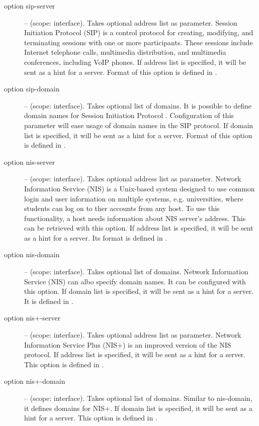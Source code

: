\begin{description}
 \item[option sip-server] -- (scope: interface). Takes optional
   address list as parameter. Session Initiation Protocol
   (SIP) \cite{rfc3263} is a control protocol for creating, modifying,
   and terminating sessions with one or more participants. These
   sessions include Internet telephone calls, multimedia distribution,
   and multimedia conferences, including VoIP phones. If address list
   is specified, it will be sent as a hint for a server. Format of
   this option is defined in \cite{rfc3319}.

 \item[option sip-domain] -- (scope: interface). Takes optional list
   of domains. It is possible to define domain names for Session
   Initiation Protocol \cite{rfc3263}. Configuration of this parameter
   will ease usage of domain names in the SIP protocol. If domain list
   is specified, it will be sent as a hint for a server. Format of
   this option is defined in \cite{rfc3319}.

 \item[option nis-server] -- (scope: interface). Takes optional
   address list as parameter. Network Information Service (NIS) is a
   Unix-based system designed to use common login and user information
   on multiple systems, e.g. universities, where students can log on
   to ther accounts from any host. To use this functionality, a host
   needs information about NIS server's address. This can be retrieved
   with this option. If address list is specified, it will be sent as
   a hint for a server. Its format is defined in \cite{rfc3898}.

 \item[option nis-domain] -- (scope: interface). Takes optional list
   of domains. Network Information Service (NIS) can albo specify
   domain names. It can be configured with this option. If domain list
   is specified, it will be sent as a hint for a server. It is defined
   in \cite{rfc3898}.

 \item[option nis+-server] -- (scope: interface). Takes optional
   address list as parameter. Network Information Service Plus (NIS+)
   is an improved version of the NIS protocol. If address list is
   specified, it will be sent as a hint for a server. This option is
   defined in \cite{rfc3898}.

 \item[option nis+-domain] -- (scope: interface). Takes optional list
   of domains. Similar to nis-domain, it defines domains for NIS+. If
   domain list is specified, it will be sent as a hint for a
   server. This option is defined in \cite{rfc3898}.


\end{description}
